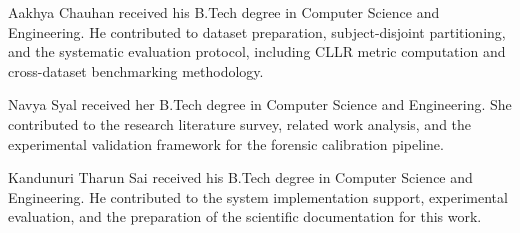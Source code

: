 \documentclass[journal]{IEEEtran}
\begin{document}
\begin{IEEEbiographynophoto}{Aakhya Chauhan}
received his B.Tech degree in Computer Science and Engineering. He contributed to dataset preparation, subject-disjoint partitioning, and the systematic evaluation protocol, including CLLR metric computation and cross-dataset benchmarking methodology.
\end{IEEEbiographynophoto}

\begin{IEEEbiographynophoto}{Navya Syal}
received her B.Tech degree in Computer Science and Engineering. She contributed to the research literature survey, related work analysis, and the experimental validation framework for the forensic calibration pipeline.
\end{IEEEbiographynophoto}

\begin{IEEEbiographynophoto}{Kandunuri Tharun Sai}
received his B.Tech degree in Computer Science and Engineering. He contributed to the system implementation support, experimental evaluation, and the preparation of the scientific documentation for this work.
\end{IEEEbiographynophoto}
\end{document}
